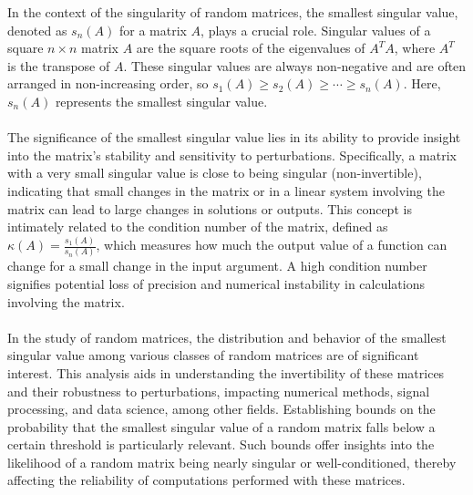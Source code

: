 In the context of the singularity of random matrices, the smallest singular value, denoted as $s_n(A)$ for a matrix $A$, plays a crucial role. Singular values of a square $n \times n$ matrix $A$ are the square roots of the eigenvalues of $A^TA$, where $A^T$ is the transpose of $A$. These singular values are always non-negative and are often arranged in non-increasing order, so $s_1(A) \geq s_2(A) \geq \cdots \geq s_n(A)$. Here, $s_n(A)$ represents the smallest singular value.\\\\
The significance of the smallest singular value lies in its ability to provide insight into the matrix's stability and sensitivity to perturbations. Specifically, a matrix with a very small singular value is close to being singular (non-invertible), indicating that small changes in the matrix or in a linear system involving the matrix can lead to large changes in solutions or outputs. This concept is intimately related to the condition number of the matrix, defined as $\kappa(A) = \frac{s_1(A)}{s_n(A)}$, which measures how much the output value of a function can change for a small change in the input argument. A high condition number signifies potential loss of precision and numerical instability in calculations involving the matrix.\\\\
In the study of random matrices, the distribution and behavior of the smallest singular value among various classes of random matrices are of significant interest. This analysis aids in understanding the invertibility of these matrices and their robustness to perturbations, impacting numerical methods, signal processing, and data science, among other fields. Establishing bounds on the probability that the smallest singular value of a random matrix falls below a certain threshold is particularly relevant. Such bounds offer insights into the likelihood of a random matrix being nearly singular or well-conditioned, thereby affecting the reliability of computations performed with these matrices.